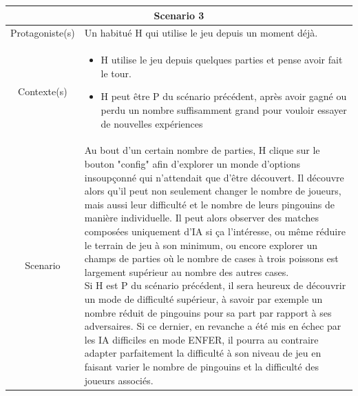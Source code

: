 \documentclass{report}
\begin{document}
 \begin{tabular}{|c|l|}
 \hline
 \multicolumn{2}{|c|}{Scenario 3}\\
 \hline
 Protagoniste(s) & Un habitué H qui utilise le jeu depuis un moment déjà. \\
 \hline
 Contexte(s) & \parbox{13cm} {\begin{itemize}
 	\item H utilise le jeu depuis quelques parties et pense avoir fait le tour.
 	\item H peut être P du scénario précédent, après avoir gagné ou perdu un nombre suffisamment grand pour vouloir essayer de nouvelles expériences
\end{itemize} }\\
 \hline
 Scenario & \parbox{13cm}{  Au bout d'un certain nombre de parties, H clique sur le bouton "config" afin d'explorer un monde d'options insoupçonné qui n'attendait que d'être découvert. Il découvre alors qu'il peut non seulement changer le nombre de joueurs, mais aussi leur difficulté et le nombre de leurs pingouins de manière individuelle. Il peut alors observer des matches composées uniquement d'IA si ça l'intéresse, ou même réduire le terrain de jeu à son minimum, ou encore explorer un champs de parties où le nombre de cases à trois poissons est largement supérieur au nombre des autres cases. \\
 Si H est P du scénario précédent, il sera heureux de découvrir un mode de difficulté supérieur, à savoir par exemple un nombre réduit de pingouins pour sa part par rapport à ses adversaires. Si ce dernier, en revanche a été mis en échec par les IA difficiles en mode ENFER, il pourra au contraire adapter parfaitement la difficulté à son niveau de jeu en faisant varier le nombre de pingouins et la difficulté des joueurs associés. } \\
 \hline
 \end{tabular}

\vspace{0.4cm}
\end{document}
